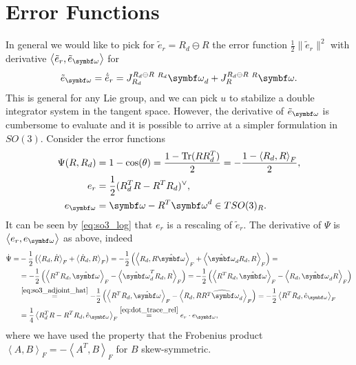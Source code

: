 \section{Error Functions}

In general we would like to pick for $\tilde e_r = R_d \ominus R$ the error function $\frac{1}{2}\| \tilde e_r \|^2$ with derivative $\left\langle \tilde e_r, \tilde e_\bomega \right\rangle$ for
\begin{equation}
  \tilde e_\bomega = {\dot {\tilde e}}_r = {J^{R_d \ominus R}_{R_d}} \; {^{R_d} \bomega_d} + {J^{R_d \ominus R}_{R}} \; {^{R} \bomega}.
\end{equation}
This is general for any Lie group, and we can pick $u$ to stabilize a double integrator system in the tangent space. However, the derivative of $\tilde e_\bomega$ is cumbersome to evaluate and it is possible to arrive at a simpler formulation in $SO(3)$. Consider the error functions
\begin{subequations}
  \begin{align}
    \Psi(R, R_d) & = 1 - \cos(\theta) = \frac{1 - \tr(R R_d^T)}{2} = - \frac{1 - \left\langle R_d, R \right\rangle_F}{2}, \\
    e_r          & = \frac{1}{2} (R_d^T R-R^T R_d)^\vee,                                                                  \\
    e_\bomega    & = \bomega - R^T \bomega^d \in T SO(3)_R.
  \end{align}
\end{subequations}
It can be seen by \eqref{eq:so3_log} that $e_r$ is a rescaling of $\tilde e_r$. The derivative of $\Psi$ is $\left\langle e_r, e_\bomega \right\rangle$ as above, indeed
\begin{equation}
  \begin{aligned}
    \dot \Psi = & -\frac{1}{2} \left( \left\langle R_d, \dot R \right\rangle_F + \left\langle \dot R_d, R \right\rangle_F \right) = - \frac{1}{2} \left( \left\langle R_d , R \hat \bomega \right\rangle_F + \left\langle \hat \bomega_d R_d , R \right\rangle_F \right) =                             \\
                & = - \frac{1}{2} \left( \left\langle R^T R_d , \hat \bomega \right\rangle_F - \left\langle \hat \bomega_d^T R_d , R \right\rangle_F \right) = - \frac{1}{2} \left( \left\langle R^T R_d , \hat \bomega \right\rangle_F - \left\langle  R_d , \hat \bomega_d R \right\rangle_F \right) \\
                & \overset{\eqref{eq:so3_adjoint_hat}}= - \frac{1}{2} \left( \left\langle R^T R_d , \hat \bomega \right\rangle_F - \left\langle  R_d , R \widehat {R^T\bomega_d} \right\rangle_F \right) = - \frac{1}{2} \left\langle R^T R_d , \hat e_\bomega \right\rangle_F                         \\
                & = \frac{1}{4} \left\langle R_d^T R - R^T R_d, \hat e_\bomega \right\rangle_F \overset{\eqref{eq:dot_trace_rel}}= e_r \cdot e_\bomega,
  \end{aligned}
\end{equation}
where we have used the property that the Frobenius product $\left\langle A, B \right\rangle_F = - \left\langle A^T, B \right\rangle_F$ for $B$ skew-symmetric.

